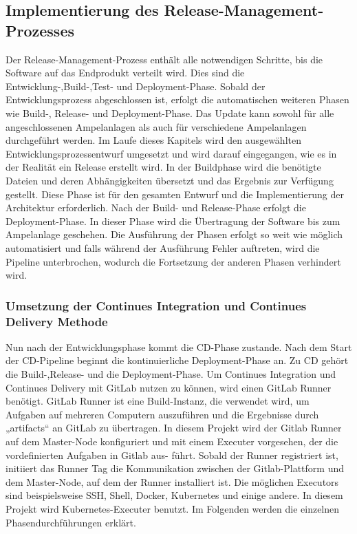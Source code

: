 \subsection{Implementierung des Release-Management-Prozesses}

Der Release-Management-Prozess enthält alle notwendigen Schritte, bis die Software auf das Endprodukt verteilt wird. Dies sind die Entwicklung-,Build-,Test- und Deployment-Phase. Sobald der Entwicklungsprozess abgeschlossen ist, erfolgt die automatischen weiteren Phasen wie Build-, Release- und Deployment-Phase. Das Update kann sowohl für alle angeschlossenen Ampelanlagen als auch für verschiedene Ampelanlagen durchgeführt werden. 
\newline\newline
Im Laufe dieses Kapitels wird den ausgewählten Entwicklungsprozessentwurf umgesetzt und wird darauf eingegangen, wie es in der Realität ein Release erstellt wird.
In der Buildphase wird die benötigte Dateien und deren Abhängigkeiten übersetzt und das Ergebnis zur Verfügung gestellt. Diese Phase ist für den gesamten Entwurf und die Implementierung der Architektur erforderlich. Nach der Build- und Release-Phase erfolgt die Deployment-Phase. In dieser Phase wird die Übertragung der Software bis zum Ampelanlage geschehen. Die Ausführung der Phasen erfolgt so weit wie möglich automatisiert und falls während der Ausführung Fehler auftreten, wird die Pipeline unterbrochen, wodurch die Fortsetzung der anderen Phasen verhindert wird.

\subsubsection{Umsetzung der Continues Integration und Continues Delivery Methode}

Nun nach der Entwicklungsphase kommt die CD-Phase zustande. Nach dem Start der CD-Pipeline beginnt die kontinuierliche Deployment-Phase an. Zu CD gehört die Build-,Release- und die Deployment-Phase. Um Continues Integration und Continues Delivery mit GitLab nutzen zu können, wird einen GitLab Runner benötigt. GitLab Runner ist eine Build-Instanz, die verwendet wird, um Aufgaben auf mehreren Computern auszuführen und die Ergebnisse durch „artifacts“ an GitLab zu übertragen.
\newline\newline
In diesem Projekt wird der Gitlab Runner auf dem Master-Node konfiguriert und mit einem Executer vorgesehen, der die vordefinierten Aufgaben in Gitlab aus-
führt. Sobald der Runner registriert ist, initiiert das Runner Tag die Kommunikation zwischen der Gitlab-Plattform und dem Master-Node, auf dem der Runner installiert ist. Die möglichen Executors sind beispielsweise SSH, Shell, Docker, Kubernetes und einige andere. In diesem Projekt wird Kubernetes-Executer benutzt.
\newline\newline
Im
Folgenden werden die einzelnen Phasendurchführungen erklärt.
